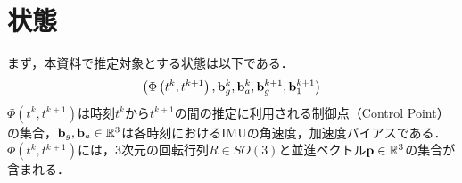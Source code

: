 



\section{状態}

まず，本資料で推定対象とする状態は以下である．
%
\begin{align}
  \left( \Phi \left( t^{k}, t^{k+1} \right),
  {\bf b}_{g}^{k}, {\bf b}_{a}^{k}, {\bf b}_{g}^{k+1}, {\bf b}_{1}^{k+1} \right)
\end{align}
%
$\Phi \left( t^{k}, t^{k+1} \right)$は時刻$t^{k}$から$t^{k+1}$の間の推定に利用される制御点（Control Point）の集合，${\bf b}_{g}, {\bf b}_{a} \in \mathbb{R}^{3}$は各時刻におけるIMUの角速度，加速度バイアスである．
$\Phi \left( t^{k}, t^{k+1} \right)$には，3次元の回転行列$R \in SO(3)$と並進ベクトル${\bf p} \in \mathbb{R}^{3}$の集合が含まれる．

